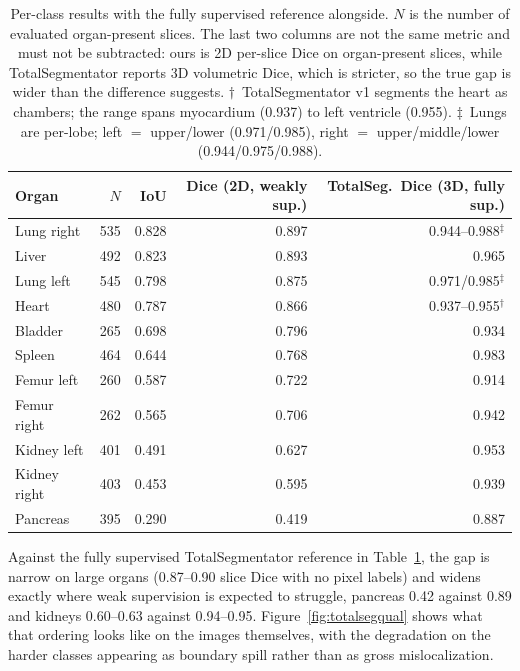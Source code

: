 \documentclass[10pt]{article}
\begin{document}
\begin{table}[!htbp]
\centering
\caption{Per-class results with the fully supervised reference alongside. $N$ is
the number of evaluated organ-present slices. The last two columns are not the
same metric and must not be subtracted: ours is 2D per-slice Dice on organ-present
slices, while TotalSegmentator \cite{wasserthal2023totalsegmentator} reports 3D
volumetric Dice, which is stricter, so the true gap is wider than the difference
suggests. $\dagger$~TotalSegmentator v1 segments the heart as chambers; the range
spans myocardium (0.937) to left ventricle (0.955). $\ddagger$~Lungs are
per-lobe; left $=$ upper/lower (0.971/0.985), right $=$ upper/middle/lower
(0.944/0.975/0.988).}
\label{tab:perclass}
\begin{tabular}{lrrrr}
\toprule
Organ & $N$ & IoU & Dice (2D, weakly sup.) & TotalSeg.\ Dice (3D, fully sup.) \\
\midrule
Lung right   & 535 & 0.828 & 0.897 & 0.944--0.988$^\ddagger$ \\
Liver        & 492 & 0.823 & 0.893 & 0.965 \\
Lung left    & 545 & 0.798 & 0.875 & 0.971/0.985$^\ddagger$ \\
Heart        & 480 & 0.787 & 0.866 & 0.937--0.955$^\dagger$ \\
Bladder      & 265 & 0.698 & 0.796 & 0.934 \\
Spleen       & 464 & 0.644 & 0.768 & 0.983 \\
Femur left   & 260 & 0.587 & 0.722 & 0.914 \\
Femur right  & 262 & 0.565 & 0.706 & 0.942 \\
Kidney left  & 401 & 0.491 & 0.627 & 0.953 \\
Kidney right & 403 & 0.453 & 0.595 & 0.939 \\
Pancreas     & 395 & 0.290 & 0.419 & 0.887 \\
\bottomrule
\end{tabular}
\end{table}

Against the fully supervised TotalSegmentator reference
\cite{wasserthal2023totalsegmentator} in Table~\ref{tab:perclass}, the gap is
narrow on large organs (0.87--0.90 slice Dice with no pixel labels) and widens
exactly where weak supervision is expected to struggle, pancreas 0.42 against
0.89 and kidneys 0.60--0.63 against 0.94--0.95. Figure~\ref{fig:totalsegqual}
shows what that ordering looks like on the images themselves, with the
degradation on the harder classes appearing as boundary spill rather than as
gross mislocalization.
\end{document}
